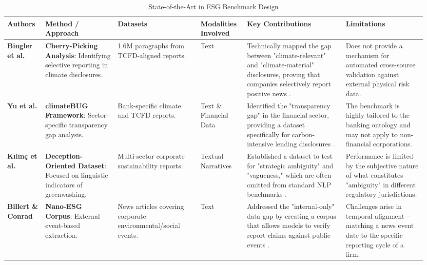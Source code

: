 \documentclass[english, online, cse, master]{dithesis}
\begin{document}
\begin{landscape}
\begin{table}[p]
\centering
\caption{State-of-the-Art in ESG Benchmark Design}
\label{tab:esg-benchmark-design}
\small
\renewcommand{\arraystretch}{1.2}
\begin{tabularx}{\linewidth}{|p{1.8cm}|p{3cm}|p{3cm}|p{1.8cm}|X|X|}
\hline
Authors & Method / Approach & Datasets & Modalities Involved & Key Contributions & Limitations \\ \hline
\textbf{Bingler et al.}  \parencite{julia_bingler_268445e3} & \textbf{Cherry-Picking Analysis}: Identifying selective reporting in climate disclosures. & 1.6M paragraphs from TCFD-aligned reports. & Text & Technically mapped the gap between "climate-relevant" and "climate-material" disclosures, proving that companies selectively report positive news  \parencite{julia_bingler_268445e3}. & Does not provide a mechanism for automated cross-source validation against external physical risk data. \\ \hline
\textbf{Yu et al.}  \parencite{yinan_yu_e282fd98} & \textbf{climateBUG Framework}: Sector-specific transparency gap analysis. & Bank-specific climate and TCFD reports. & Text \& Financial Data & Identified the "transparency gap" in the financial sector, providing a dataset specifically for carbon-intensive lending disclosures  \parencite{yinan_yu_e282fd98}. & The benchmark is highly tailored to the banking ontology and may not apply to non-financial corporations. \\ \hline
\textbf{Kılınç et al.}  \parencite{yavuz_k_l_n__64e32f80} & \textbf{Deception-Oriented Dataset}: Focused on linguistic indicators of greenwashing. & Multi-sector corporate sustainability reports. & Textual Narratives & Established a dataset to test for "strategic ambiguity" and "vagueness," which are often omitted from standard NLP benchmarks  \parencite{yavuz_k_l_n__64e32f80}. & Performance is limited by the subjective nature of what constitutes "ambiguity" in different regulatory jurisdictions. \\ \hline
\textbf{Billert \& Conrad}  \parencite{fabian_billert_a5fbb687} & \textbf{Nano-ESG Corpus}: External event-based extraction. & News articles covering corporate environmental/social events. & Text & Addressed the "internal-only" data gap by creating a corpus that allows models to verify report claims against public events  \parencite{fabian_billert_a5fbb687}. & Challenges arise in temporal alignment—matching a news event date to the specific reporting cycle of a firm. \\ \hline

\end{tabularx}
\end{table}
\end{landscape}
\end{document}
